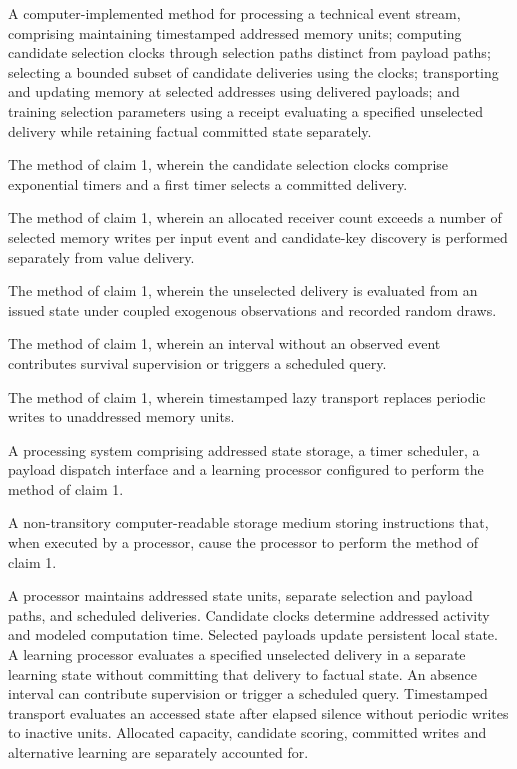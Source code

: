 \documentclass[pct]{sm-patent}
\begin{document}
\begin{patentclaims}

\item A computer-implemented method for processing a technical event stream, comprising maintaining timestamped addressed memory units; computing candidate selection clocks through selection paths distinct from payload paths; selecting a bounded subset of candidate deliveries using the clocks; transporting and updating memory at selected addresses using delivered payloads; and training selection parameters using a receipt evaluating a specified unselected delivery while retaining factual committed state separately.

\item The method of claim 1, wherein the candidate selection clocks comprise exponential timers and a first timer selects a committed delivery.

\item The method of claim 1, wherein an allocated receiver count exceeds a number of selected memory writes per input event and candidate-key discovery is performed separately from value delivery.

\item The method of claim 1, wherein the unselected delivery is evaluated from an issued state under coupled exogenous observations and recorded random draws.

\item The method of claim 1, wherein an interval without an observed event contributes survival supervision or triggers a scheduled query.

\item The method of claim 1, wherein timestamped lazy transport replaces periodic writes to unaddressed memory units.

\item A processing system comprising addressed state storage, a timer scheduler, a payload dispatch interface and a learning processor configured to perform the method of claim 1.

\item A non-transitory computer-readable storage medium storing instructions that, when executed by a processor, cause the processor to perform the method of claim 1.

\end{patentclaims}

\abstractstart

A processor maintains addressed state units, separate selection and payload paths, and scheduled deliveries. Candidate clocks determine addressed activity and modeled computation time. Selected payloads update persistent local state. A learning processor evaluates a specified unselected delivery in a separate learning state without committing that delivery to factual state. An absence interval can contribute supervision or trigger a scheduled query. Timestamped transport evaluates an accessed state after elapsed silence without periodic writes to inactive units. Allocated capacity, candidate scoring, committed writes and alternative learning are separately accounted for.
\end{document}
